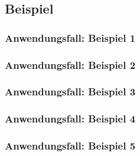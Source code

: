 \documentclass[enabledeprecatedfontcommands,fontsize=12pt,paper=a4,twoside]{scrartcl}
\begin{document}
\subsection{Beispiel}

\subsubsection{Anwendungsfall: Beispiel 1}


\subsubsection{Anwendungsfall: Beispiel 2}


\subsubsection{Anwendungsfall: Beispiel 3}


\subsubsection{Anwendungsfall: Beispiel 4}


\subsubsection{Anwendungsfall: Beispiel 5}

\end{document}
